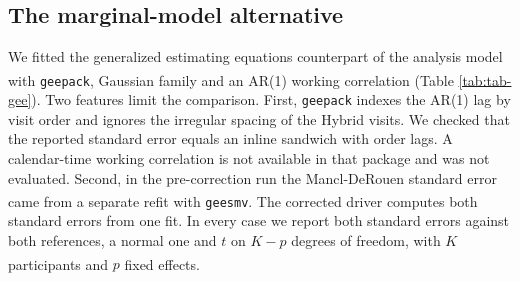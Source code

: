 \documentclass[
  11pt,
]{article}
\begin{document}
\subsection{The marginal-model alternative}\label{the-marginal-model-alternative}

We fitted the generalized estimating equations counterpart of the
analysis model with \texttt{geepack}\textsuperscript{}, Gaussian family and an
AR(1) working correlation (Table \ref{tab:tab-gee}). Two features
limit the comparison. First, \texttt{geepack} indexes the AR(1) lag by visit
order and ignores the irregular spacing of the Hybrid visits. We
checked that the reported standard error equals an inline sandwich
with order lags. A calendar-time working correlation is not available
in that package and was not evaluated. Second, in the pre-correction
run the Mancl-DeRouen standard error came from a separate refit with
\texttt{geesmv}\textsuperscript{}. The corrected driver computes both standard errors from one
fit. In every case we report both standard errors against both
references, a normal one and \(t\) on \(K - p\) degrees of freedom, with
\(K\) participants and \(p\) fixed effects\textsuperscript{}.

\begin{table}
\centering
\caption{\label{tab:tab-gee}Generalized estimating equations at the primary null cell, AR(1) working correlation in visit order. Extended DGP ($c_\times = 0.2$, carryover decaying from the last on-drug mean). LZ is the Liang-Zeger sandwich and MD the Mancl-DeRouen sandwich. Entries in the four rightmost rate columns are Type I error (MCSE). Relative efficiency is the variance of the M3 estimate over that of the GEE estimate on the same datasets.}
\centering
{}
\end{table}
\end{document}
